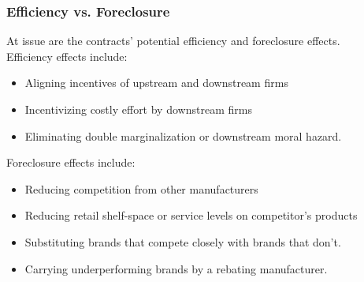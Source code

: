 \documentclass[aspectratio=169,11pt]{beamer}
\begin{document}
\begin{frame}
\frametitle{Efficiency vs. Foreclosure}
\small
At issue are the contracts' potential efficiency and foreclosure effects.\\
\vfill
Efficiency effects include:
\begin{itemize}\small
\item Aligning incentives of upstream and downstream firms
\item Incentivizing costly effort by downstream firms
\item Eliminating double marginalization or downstream moral hazard.
\end{itemize} 
Foreclosure effects include:
\begin{itemize}\small
\item Reducing competition from other manufacturers
\item Reducing retail shelf-space or service levels on competitor's products
\item Substituting brands that compete closely with brands that don't.
\item Carrying underperforming brands by a rebating manufacturer.
\end{itemize} 
\end{frame}
\end{document}

